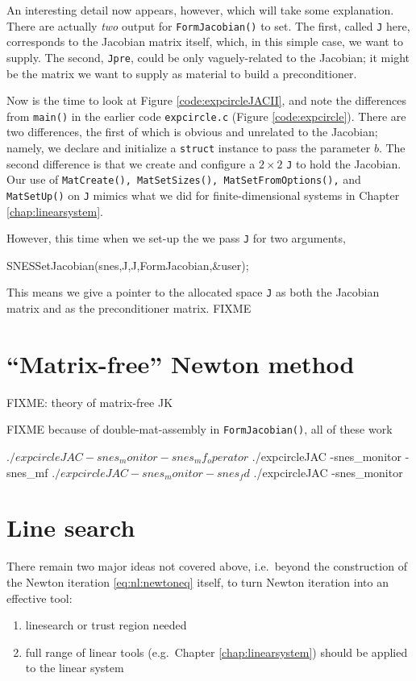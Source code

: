 An interesting detail now appears, however, which will take some explanation.  There are actually \emph{two} output \pMats for \texttt{FormJacobian()} to set.  The first, called \texttt{J} here, corresponds to the Jacobian matrix itself, which, in this simple case, we want to supply.  The second, \texttt{Jpre}, could be only vaguely-related to the Jacobian; it might be the matrix we want to supply as material to build a preconditioner.

Now is the time to look at Figure \ref{code:expcircleJACII}, and note the differences from \texttt{main()} in the earlier code \texttt{expcircle.c} (Figure \ref{code:expcircle}).  There are two differences, the first of which is obvious and unrelated to the Jacobian; namely, we declare and initialize a \texttt{struct} instance to pass the parameter $b$.  The second difference is that we create and configure a $2\times 2$ \pMat \texttt{J} to hold the Jacobian.  Our use of \texttt{MatCreate(), MatSetSizes(), MatSetFromOptions(),} and \texttt{MatSetUp()} on \texttt{J} mimics what we did for finite-dimensional systems in Chapter \ref{chap:linearsystem}.

However, this time when we set-up the \pSNES we pass \texttt{J} for two arguments,
\begin{code}
SNESSetJacobian(snes,J,J,FormJacobian,&user);
\end{code}
This means we give a pointer to the allocated space \pMat \texttt{J} as both the Jacobian matrix and as the preconditioner matrix.  FIXME


\section{``Matrix-free'' Newton method}

FIXME: theory of matrix-free JK \cite{KnollKeyes2004}

FIXME because of double-mat-assembly in \texttt{FormJacobian()}, all of these work

\begin{cline}
$ ./expcircleJAC -snes_monitor -snes_mf_operator
$ ./expcircleJAC -snes_monitor -snes_mf
$ ./expcircleJAC -snes_monitor -snes_fd
$ ./expcircleJAC -snes_monitor
\end{cline}


\section{Line search}

There remain two major ideas not covered above, i.e.~beyond the construction of the Newton iteration \eqref{eq:nl:newtoneq} itself, to turn Newton iteration into an effective tool:
\renewcommand{\labelenumi}{\roman{enumi})}
\begin{enumerate}
\item linesearch or trust region needed \citep{Kelley2003}
\item full range of linear tools (e.g.~Chapter \ref{chap:linearsystem}) should be applied to the linear system
\end{enumerate}

